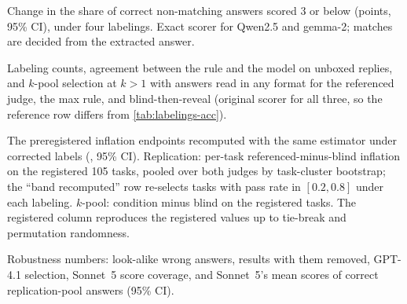 \begin{table}[htbp]
\centering
\caption{Change in the share of correct non-matching answers scored 3 or below (points, 95\% CI), under four labelings. Exact scorer for Qwen2.5 and gemma-2; matches are decided from the extracted answer.\ph}
\label{tab:labelings-fr}
\footnotesize
\setlength{\tabcolsep}{3pt}
\begin{adjustbox}{max width=\linewidth}\end{adjustbox}
\end{table}

\begin{table}[htbp]
\centering
\caption{Labeling counts, agreement between the rule and the model on unboxed replies, and $k$-pool selection at $k{>}1$ with answers read in any format for the referenced judge, the max rule, and blind-then-reveal (original scorer for all three, so the reference row differs from \cref{tab:labelings-acc}).\ph}
\label{tab:labelings-numbers}
\footnotesize
\begin{adjustbox}{max width=\linewidth}\end{adjustbox}
\end{table}

\begin{table}[htbp]
\centering
\caption{The preregistered inflation endpoints recomputed with the same estimator under corrected labels (\sd, 95\% CI). Replication: per-task referenced-minus-blind inflation on the registered 105 tasks, pooled over both judges by task-cluster bootstrap; the ``band recomputed'' row re-selects tasks with pass rate in $[0.2, 0.8]$ under each labeling. $k$-pool: condition minus blind on the registered tasks. The registered column reproduces the registered values up to tie-break and permutation randomness.\ph}
\label{tab:inflation-relabeled}
\footnotesize
\setlength{\tabcolsep}{3pt}
\begin{adjustbox}{max width=\linewidth}\end{adjustbox}
\end{table}

\begin{table}[htbp]
\centering
\footnotesize
\caption{Robustness numbers: look-alike wrong answers, results with them removed, GPT-4.1 selection, Sonnet~5 score coverage, and Sonnet~5's mean scores of correct replication-pool answers (95\% CI).\ph}
\label{tab:round7}
\begin{adjustbox}{max width=\linewidth}\end{adjustbox}
\end{table}

